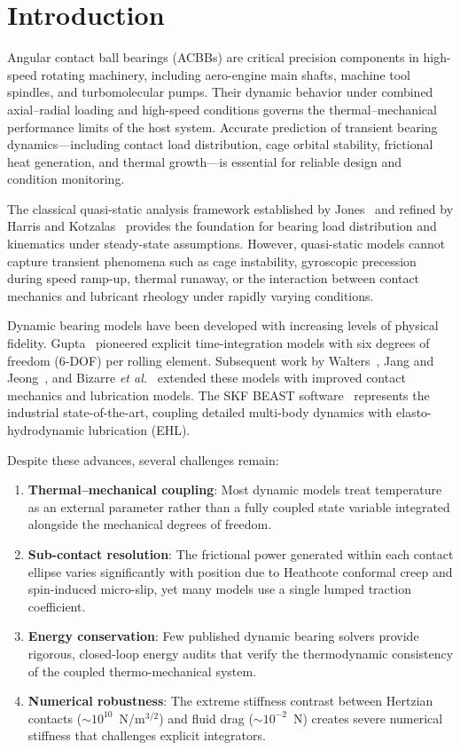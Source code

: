 \documentclass[machines,article,submit,pdftex,moreauthors]{Definitions/mdpi}
\begin{document}
\section{Introduction}
\label{sec:intro}

Angular contact ball bearings (ACBBs) are critical precision components in high-speed rotating machinery, including aero-engine main shafts, machine tool spindles, and turbomolecular pumps. Their dynamic behavior under combined axial--radial loading and high-speed conditions governs the thermal--mechanical performance limits of the host system. Accurate prediction of transient bearing dynamics---including contact load distribution, cage orbital stability, frictional heat generation, and thermal growth---is essential for reliable design and condition monitoring.

The classical quasi-static analysis framework established by Jones~\cite{Jones1960} and refined by Harris and Kotzalas~\cite{Harris2006} provides the foundation for bearing load distribution and kinematics under steady-state assumptions. However, quasi-static models cannot capture transient phenomena such as cage instability, gyroscopic precession during speed ramp-up, thermal runaway, or the interaction between contact mechanics and lubricant rheology under rapidly varying conditions.

Dynamic bearing models have been developed with increasing levels of physical fidelity. Gupta~\cite{Gupta1984} pioneered explicit time-integration models with six degrees of freedom (6-DOF) per rolling element. Subsequent work by Walters~\cite{Walters1971}, Jang and Jeong~\cite{Jang2004}, and Bizarre \textit{et al.}~\cite{Bizarre2018} extended these models with improved contact mechanics and lubrication models. The SKF BEAST software~\cite{Stacke1999} represents the industrial state-of-the-art, coupling detailed multi-body dynamics with elasto-hydrodynamic lubrication (EHL).

Despite these advances, several challenges remain:
\begin{enumerate}
    \item \textbf{Thermal--mechanical coupling}: Most dynamic models treat temperature as an external parameter rather than a fully coupled state variable integrated alongside the mechanical degrees of freedom.
    \item \textbf{Sub-contact resolution}: The frictional power generated within each contact ellipse varies significantly with position due to Heathcote conformal creep and spin-induced micro-slip, yet many models use a single lumped traction coefficient.
    \item \textbf{Energy conservation}: Few published dynamic bearing solvers provide rigorous, closed-loop energy audits that verify the thermodynamic consistency of the coupled thermo-mechanical system.
    \item \textbf{Numerical robustness}: The extreme stiffness contrast between Hertzian contacts ($\sim 10^{10}$~N/m$^{3/2}$) and fluid drag ($\sim 10^{-2}$~N) creates severe numerical stiffness that challenges explicit integrators.
\end{enumerate}
\end{document}
